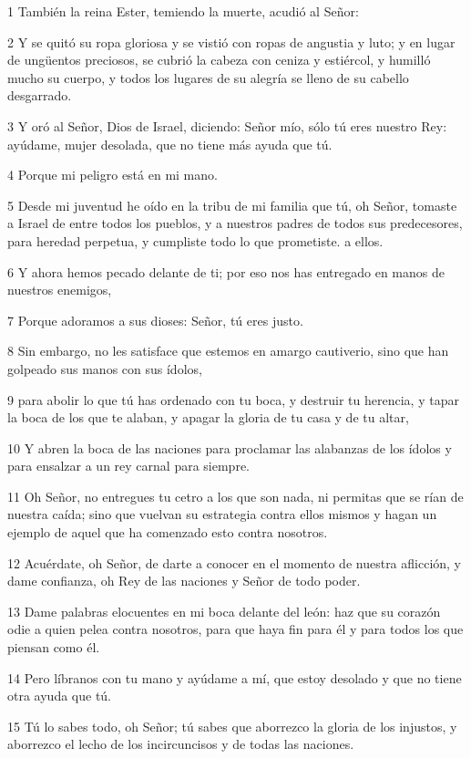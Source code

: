 \par 1 También la reina Ester, temiendo la muerte, acudió al Señor:
\par 2 Y se quitó su ropa gloriosa y se vistió con ropas de angustia y luto; y en lugar de ungüentos preciosos, se cubrió la cabeza con ceniza y estiércol, y humilló mucho su cuerpo, y todos los lugares de su alegría se lleno de su cabello desgarrado.
\par 3 Y oró al Señor, Dios de Israel, diciendo: Señor mío, sólo tú eres nuestro Rey: ayúdame, mujer desolada, que no tiene más ayuda que tú.
\par 4 Porque mi peligro está en mi mano.
\par 5 Desde mi juventud he oído en la tribu de mi familia que tú, oh Señor, tomaste a Israel de entre todos los pueblos, y a nuestros padres de todos sus predecesores, para heredad perpetua, y cumpliste todo lo que prometiste. a ellos.
\par 6 Y ahora hemos pecado delante de ti; por eso nos has entregado en manos de nuestros enemigos,
\par 7 Porque adoramos a sus dioses: Señor, tú eres justo.
\par 8 Sin embargo, no les satisface que estemos en amargo cautiverio, sino que han golpeado sus manos con sus ídolos,
\par 9 para abolir lo que tú has ordenado con tu boca, y destruir tu herencia, y tapar la boca de los que te alaban, y apagar la gloria de tu casa y de tu altar,
\par 10 Y abren la boca de las naciones para proclamar las alabanzas de los ídolos y para ensalzar a un rey carnal para siempre.
\par 11 Oh Señor, no entregues tu cetro a los que son nada, ni permitas que se rían de nuestra caída; sino que vuelvan su estrategia contra ellos mismos y hagan un ejemplo de aquel que ha comenzado esto contra nosotros.
\par 12 Acuérdate, oh Señor, de darte a conocer en el momento de nuestra aflicción, y dame confianza, oh Rey de las naciones y Señor de todo poder.
\par 13 Dame palabras elocuentes en mi boca delante del león: haz que su corazón odie a quien pelea contra nosotros, para que haya fin para él y para todos los que piensan como él.
\par 14 Pero líbranos con tu mano y ayúdame a mí, que estoy desolado y que no tiene otra ayuda que tú.
\par 15 Tú lo sabes todo, oh Señor; tú sabes que aborrezco la gloria de los injustos, y aborrezco el lecho de los incircuncisos y de todas las naciones.
